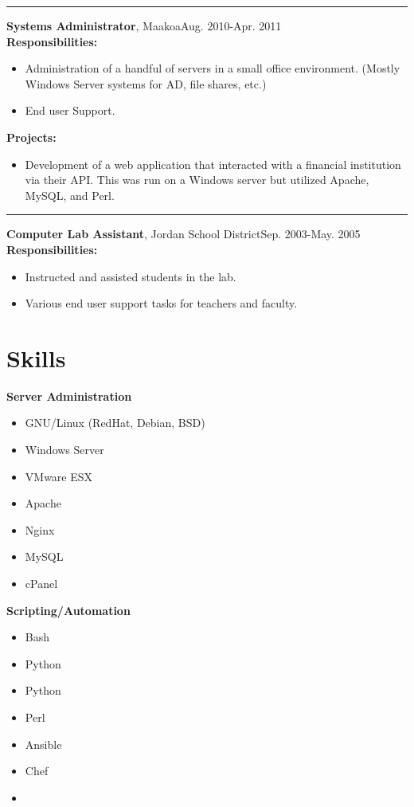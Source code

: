\documentclass[10pt]{article}
\newenvironment{myitemize}
{ \begin{itemize}[topsep=0pt]
    \setlength{\itemsep}{0pt}
    \setlength{\parskip}{0pt}
    \setlength{\parsep}{0pt}     }
{ \end{itemize}                  }
\newenvironment{skillitemize}
{ \begin{itemize}[topsep=0pt,label={}]
    \setlength{\itemsep}{0pt}
    \setlength{\parskip}{0pt}
    \setlength{\parsep}{0pt}     }
{ \end{itemize}                  }
\newcommand{\breakrule}{
  	\color{lightgray}
  	\vspace{-4pt}
	\begin{center}
		\noindent\rule{7cm}{0.5pt}
	\end{center}
	}
\begin{document}
{\breakrule}

\noindent
{\large {\bf Systems Administrator}, Maakoa\hfill Aug. 2010-Apr. 2011 } \\
{\bf Responsibilities:}
\begin{myitemize}
  \item Administration of a handful of servers in a small office environment. (Mostly Windows Server systems for AD, file shares, etc.)
  \item End user Support.
\end{myitemize} 
{\bf Projects:}
\begin{myitemize}
 \item Development of a web application that interacted with a financial institution via their API. This was run on a Windows server but utilized Apache, MySQL, and Perl.
\end{myitemize} 

{\breakrule}

\noindent
{\large {\bf Computer Lab Assistant}, Jordan School District\hfill Sep. 2003-May. 2005 } \\
{\bf Responsibilities:}
\begin{myitemize}
  \item  Instructed and assisted students in the lab.
  \item  Various end user support tasks for teachers and faculty.
\end{myitemize} 

\section*{Skills}

\begin{minipage}[ht]{0.48\textwidth}
	{\bf Server Administration}
	\begin{skillitemize}
		\item GNU/Linux (RedHat, Debian, BSD)
		\item Windows Server
		\item VMware ESX
		\item Apache
		\item Nginx
		\item MySQL
		\item cPanel
	\end{skillitemize}
\end{minipage}
\begin{minipage}[ht]{0.48\textwidth}
	{\bf Scripting/Automation}
	\begin{skillitemize}
		\item Bash
		\item Python
		\item Python
		\item Perl
		\item Ansible
    \item Chef
    \item 
	\end{skillitemize}
\end{minipage}
\end{document}
